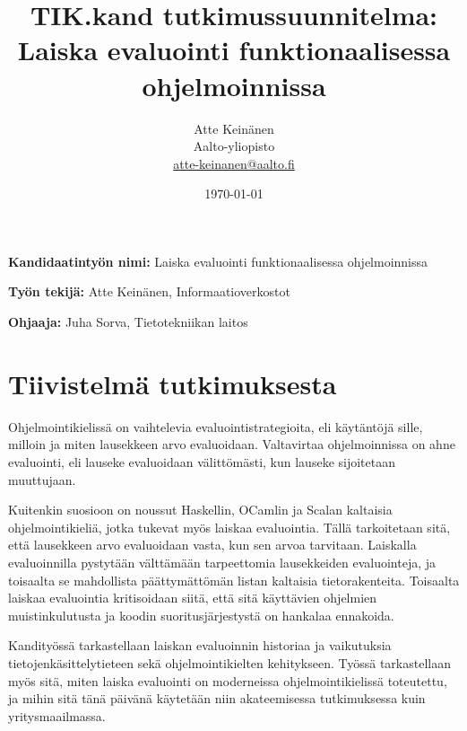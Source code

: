 \documentclass[12pt,a4paper,finnish,oneside]{article}
\begin{document}

\title{TIK.kand tutkimussuunnitelma:\\[5mm] Laiska evaluointi funktionaalisessa ohjelmoinnissa}

\author{Atte Keinänen\\
Aalto-yliopisto\\
\url{atte-keinanen@aalto.fi}}

\date{\today}

\maketitle

%

\textbf{Kandidaatintyön nimi:} Laiska evaluointi funktionaalisessa ohjelmoinnissa

\textbf{Työn tekijä:} Atte Keinänen, Informaatioverkostot

\textbf{Ohjaaja:} Juha Sorva, Tietotekniikan laitos


\section{Tiivistelmä tutkimuksesta}

Ohjelmointikielissä on vaihtelevia evaluointistrategioita, eli käytäntöjä sille, milloin ja miten lausekkeen arvo evaluoidaan. Valtavirtaa ohjelmoinnissa on ahne evaluointi, eli lauseke evaluoidaan välittömästi, kun lauseke sijoitetaan muuttujaan.

Kuitenkin suosioon on noussut Haskellin, OCamlin ja Scalan kaltaisia ohjelmointikieliä, jotka tukevat myös laiskaa evaluointia. Tällä tarkoitetaan sitä, että lausekkeen arvo evaluoidaan vasta, kun sen arvoa tarvitaan. Laiskalla evaluoinnilla pystytään välttämään tarpeettomia lausekkeiden evaluointeja, ja toisaalta se mahdollista päättymättömän listan kaltaisia tietorakenteita. Toisaalta laiskaa evaluointia kritisoidaan siitä, että sitä käyttävien ohjelmien muistinkulutusta ja koodin suoritusjärjestystä on hankalaa ennakoida.

Kandityössä tarkastellaan laiskan evaluoinnin historiaa ja vaikutuksia tietojenkäsittelytieteen sekä ohjelmointikielten kehitykseen. Työssä tarkastellaan myös sitä, miten laiska evaluointi on moderneissa ohjelmointikielissä toteutettu, ja mihin sitä tänä päivänä käytetään niin akateemisessa tutkimuksessa kuin yritysmaailmassa.
\end{document}
